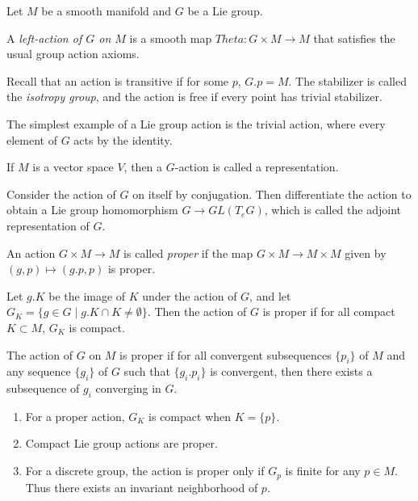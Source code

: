 \documentclass[twoside, 10pt]{article}
\begin{document}
    Let $M$ be a smooth manifold and $G$ be a Lie group.

    \begin{defn}
        A \textit{left-action of $G$ on $M$} is a smooth map $Theta:G \times M \to M$ that satisfies the usual group action axioms.
    \end{defn}

    Recall that an action is transitive if for some $p$, $G.p = M$. The stabilizer is called the \textit{isotropy group}, and the action is free if every point has trivial stabilizer.

    \begin{exm}
        The simplest example of a Lie group action is the trivial action, where every element of $G$ acts by the identity.
    \end{exm}

    \begin{exm}
        If $M$ is a vector space $V$, then a $G$-action is called a representation.
    \end{exm}

    \begin{exm}
        Consider the action of $G$ on itself by conjugation. Then differentiate the action to obtain a Lie group homomorphism $G \to GL(T_eG)$, which is called the adjoint representation of $G$.
    \end{exm}

    \begin{defn}
        An action $G \times M \to M$ is called \textit{proper} if the map $G \times M \to M \times M$ given by $(g,p) \mapsto (g.p,p)$ is proper.
    \end{defn}

    \begin{prop}
        Let $g.K$ be the image of $K$ under the action of $G$, and let $G_K = \{g \in G \mid g.K \cap K \neq \emptyset \}$. Then the action of $G$ is proper if for all compact $K \subset M$, $G_K$ is compact.
    \end{prop}
    
    \begin{prop}
        The action of $G$ on $M$ is proper if for all convergent subsequences $\{p_i\}$ of $M$ and any sequence $\{g_i\}$ of $G$ such that $\{g_i.p_i\}$ is convergent, then there exists a subsequence of $g_i$ converging in $G$.
    \end{prop}

    \begin{rmk}
        \begin{enumerate}
            \item For a proper action, $G_K$ is compact when $K = \{p\}$.
            \item Compact Lie group actions are proper.
            \item For a discrete group, the action is proper only if $G_p$ is finite for any $p \in M$. Thus there exists an invariant neighborhood of $p$.
        \end{enumerate}
    \end{rmk}
\end{document}
